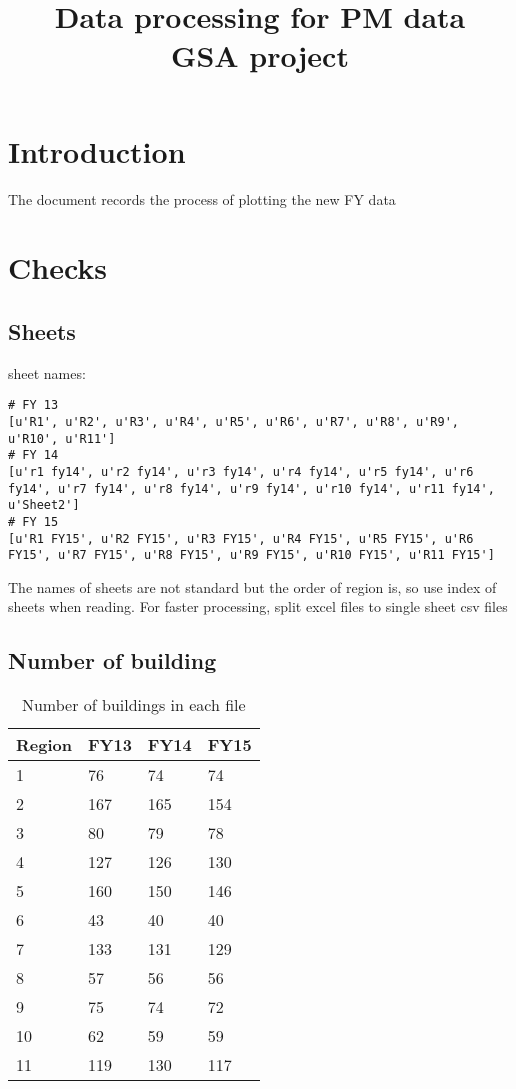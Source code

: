 \documentclass[12pt]{article}
\begin{document}
\title{Data processing for PM data\\
       \large GSA project}
\maketitle
\tableofcontents
\newpage
\section{Introduction}\label{sec:intro}
The document records the process of plotting the new FY data 

\section{Checks}
\subsection{Sheets}
sheet names:
\makeatletter
\def\verbatim@font{\linespread{1}\small\ttfamily}
\begin{verbatim}
# FY 13
[u'R1', u'R2', u'R3', u'R4', u'R5', u'R6', u'R7', u'R8', u'R9', u'R10', u'R11']
# FY 14
[u'r1 fy14', u'r2 fy14', u'r3 fy14', u'r4 fy14', u'r5 fy14', u'r6 fy14', u'r7 fy14', u'r8 fy14', u'r9 fy14', u'r10 fy14', u'r11 fy14', u'Sheet2']
# FY 15
[u'R1 FY15', u'R2 FY15', u'R3 FY15', u'R4 FY15', u'R5 FY15', u'R6 FY15', u'R7 FY15', u'R8 FY15', u'R9 FY15', u'R10 FY15', u'R11 FY15']
\end{verbatim}
The names of sheets are not standard but the order of region is, so use index of sheets when reading.
For faster processing, split excel files to single sheet csv files
\subsection{Number of building}
\begin{table}[h!]
\centering
\caption{Number of buildings in each file}
\label{tab:num_bd}
\begin{tabular}{llll}
  \hline
Region&FY13 & FY14 & FY15\\
  \hline
1    & 76   & 74   & 74  \\
2    & 167  & 165  & 154 \\
3    & 80   & 79   & 78  \\
4    & 127  & 126  & 130 \\
5    & 160  & 150  & 146 \\
6    & 43   & 40   & 40  \\
7    & 133  & 131  & 129 \\
8    & 57   & 56   & 56  \\
9    & 75   & 74   & 72  \\
10   & 62   & 59   & 59  \\
11   & 119  & 130  & 117 \\
  \hline
\end{tabular}
\end{table} 
\end{document}
